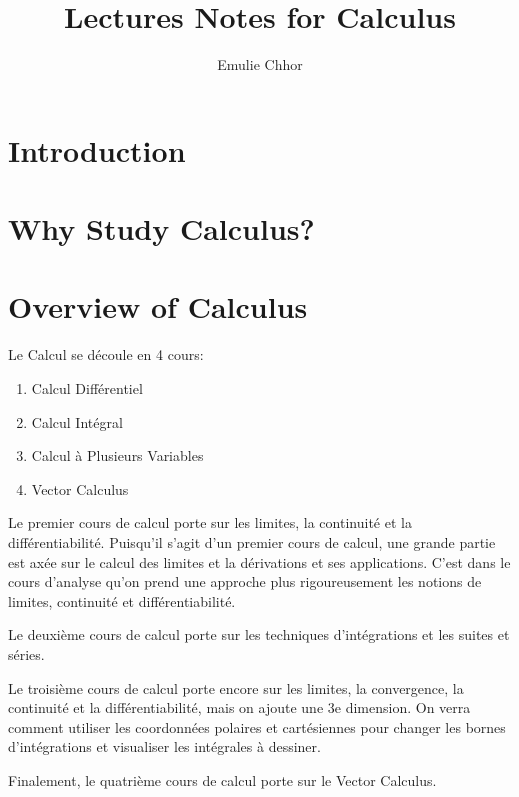 \documentclass{article}
\begin{document}
\title{Lectures Notes for Calculus}
\author{Emulie Chhor}
\maketitle

\section*{Introduction}

\section{Why Study Calculus?}

\section{Overview of Calculus}

Le Calcul se découle en 4 cours:

    \begin{enumerate}
	\item Calcul Différentiel
	\item Calcul Intégral
	\item Calcul à Plusieurs Variables
	\item Vector Calculus
    \end{enumerate}

Le premier cours de calcul porte sur les limites, la continuité et la
différentiabilité. Puisqu'il s'agit d'un premier cours de calcul, une grande
partie est axée sur le calcul des limites et la dérivations et ses applications.
C'est dans le cours d'analyse qu'on prend une approche plus rigoureusement les
notions de limites, continuité et différentiabilité.

Le deuxième cours de calcul porte sur les techniques d'intégrations et les suites
et séries.

Le troisième cours de calcul porte encore sur les limites, la convergence,
la continuité et la différentiabilité, mais on ajoute une 3e dimension. On verra
comment utiliser les coordonnées polaires et cartésiennes pour changer les bornes
d'intégrations et visualiser les intégrales à dessiner.

Finalement, le quatrième cours de calcul porte sur le Vector Calculus.

\pagebreak

\newtheorem{definition}{Definition}[subsection]
\newtheorem{theorem}{Theorem}[subsection]
\newtheorem{corollary}{Corollary}[subsection]
\newtheorem{lemma}[theorem]{Lemma}
\newtheorem{proposition}{Proposition}[section]
\newtheorem{axiom}{Axiome}
\newtheorem{property}{Propriété}[subsection]
\newtheorem*{remark}{Remarque}
\newtheorem*{problem}{Problème}
\newtheorem*{intuition}{Intuition}
\end{document}
